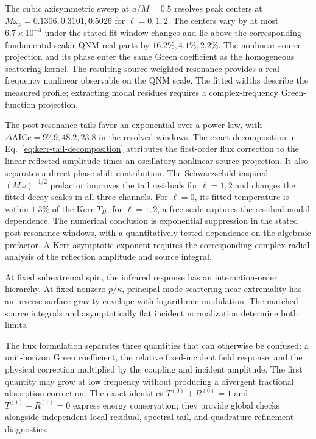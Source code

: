 \documentclass[aps,prd,twocolumn,10pt,nofootinbib,superscriptaddress,floatfix]{revtex4-2}
\begin{document}
The cubic axisymmetric sweep at $a/M=0.5$ resolves peak centers at
$M\omega_p=0.1306,0.3101,0.5026$ for $\ell=0,1,2$.
The centers vary by at most $6.7\times10^{-4}$ under the stated fit-window
changes and lie above the corresponding fundamental scalar QNM real
parts by $16.2\%,4.1\%,2.2\%$.
The nonlinear source projection and its phase enter the same Green
coefficient as the homogeneous scattering kernel.  The resulting
source-weighted resonance provides a real-frequency nonlinear observable
on the QNM scale.  The fitted widths describe the measured profile;
extracting modal residues requires a complex-frequency Green-function
projection.

The post-resonance tails favor an exponential over a power law, with
$\Delta\mathrm{AICc}=97.9,48.2,23.8$ in the resolved windows.
The exact decomposition in Eq.~\eqref{eq:kerr-tail-decomposition} attributes
the first-order flux correction to the linear reflected amplitude times
an oscillatory nonlinear source projection.  It also separates a direct
phase-shift contribution.  The Schwarzschild-inspired
$(M\omega)^{-1/2}$ prefactor improves the tail residuals for $\ell=1,2$
and changes the fitted decay scales in all three channels.
For $\ell=0$, its fitted temperature is within $1.3\%$ of the Kerr $T_H$;
for $\ell=1,2$, a free scale captures the residual modal dependence.
The numerical conclusion is exponential suppression in the stated
post-resonance windows, with a quantitatively tested dependence on the
algebraic prefactor.  A Kerr asymptotic exponent requires the corresponding
complex-radial analysis of the reflection amplitude and source integral.

At fixed subextremal spin, the infrared response has an interaction-order
hierarchy.  At fixed nonzero $p/\kappa$, principal-mode scattering near
extremality has an inverse-surface-gravity envelope with logarithmic
modulation.  The matched source integrals and asymptotically flat incident
normalization determine both limits.

The flux formulation separates three quantities that can otherwise be
confused: a unit-horizon Green coefficient, the relative fixed-incident field
response, and the physical correction multiplied by the coupling and incident
amplitude.  The first quantity may grow at low frequency without producing a
divergent fractional absorption correction.  The exact identities
$T^{(0)}+R^{(0)}=1$ and $T^{(1)}+R^{(1)}=0$ express energy conservation;
they provide global checks alongside independent local residual,
spectral-tail, and quadrature-refinement diagnostics.
\end{document}
